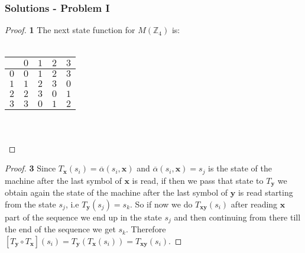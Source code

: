 \documentclass[11pt]{article}
\begin{document}
 	\subsubsection*{Solutions - Problem I}
		\begin{proof}{\textbf{1}}
			The next state function for $M(\mathbb{Z}_4)$ is:\\\\
			\begin{adjustbox}{max width=\textwidth,center}
			\begin{tabular}{l|llll}
				    & $0$ & $1$ & $2$ & $3$ \\ \hline
				$0$ & $0$ & $1$ & $2$ & $3$ \\
				$1$ & $1$ & $2$ & $3$ & $0$ \\
				$2$ & $2$ & $3$ & $0$ & $1$ \\
				$3$ & $3$ & $0$ & $1$ & $2$ \\
			\end{tabular}
			\end{adjustbox}\\\\
		\end{proof}
		\begin{proof}{\textbf{3}}
			Since $T_{\bm{x}}(s_i) = \overline{\alpha}(s_i, \bm{x})$ and $\overline{\alpha}(s_i, \bm{x})=s_j$ is the state of the machine after the last symbol of $\bm{x}$ is read, if then we pass that state to $T_{\bm{y}}$ we obtain again the state of the machine after the last symbol of $\bm{y}$ is read starting from the state $s_j$, i.e $T_{\bm{y}}(s_j)=s_k$. So if now we do $T_{\bm{xy}}(s_i)$ after reading $\bm{x}$ part of the sequence we end up in the state $s_j$ and then continuing from there till the end of the sequence we get $s_k$. Therefore $[T_{\bm{y}} \circ T_{\bm{x}}](s_i) = T_{\bm{y}}(T_{\bm{x}}(s_i)) = T_{\bm{xy}}(s_i)$.
		\end{proof}
\end{document}
